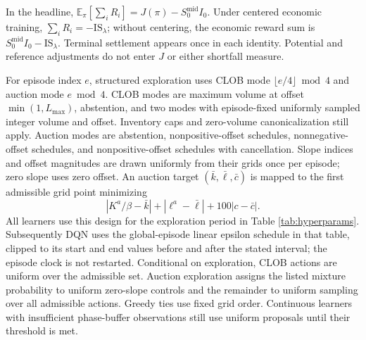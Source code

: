 \documentclass[11pt]{article}
\begin{document}
In the headline, $\mathbb E_\pi[\sum_iR_i]=J(\pi)-S_0^{\mathrm{mid}}I_0$. Under centered economic training, $\sum_iR_i=-\mathrm{IS}_\lambda$; without centering, the economic reward sum is $S_0^{\mathrm{mid}}I_0-\mathrm{IS}_\lambda$. Terminal settlement appears once in each identity. Potential and reference adjustments do not enter $J$ or either shortfall measure.\vspace{0.5em}

\label{app:learners}
For episode index $e$, structured exploration uses CLOB mode $\lfloor e/4\rfloor\bmod4$ and auction mode $e\bmod4$. CLOB modes are maximum volume at offset $\min(1,L_{\max})$, abstention, and two modes with episode-fixed uniformly sampled integer volume and offset. Inventory caps and zero-volume canonicalization still apply. Auction modes are abstention, nonpositive-offset schedules, nonnegative-offset schedules, and nonpositive-offset schedules with cancellation. Slope indices and offset magnitudes are drawn uniformly from their grids once per episode; zero slope uses zero offset. An auction target $(\bar k,\bar\ell,\bar c)$ is mapped to the first admissible grid point minimizing
\[
|K^a/\beta-\bar k|+|\ell^a-\bar\ell|+100|c-\bar c|.
\]
All learners use this design for the exploration period in Table \ref{tab:hyperparams}. Subsequently DQN uses the global-episode linear epsilon schedule in that table, clipped to its start and end values before and after the stated interval; the episode clock is not restarted. Conditional on exploration, CLOB actions are uniform over the admissible set. Auction exploration assigns the listed mixture probability to uniform zero-slope controls and the remainder to uniform sampling over all admissible actions. Greedy ties use fixed grid order. Continuous learners with insufficient phase-buffer observations still use uniform proposals until their threshold is met.
\end{document}
